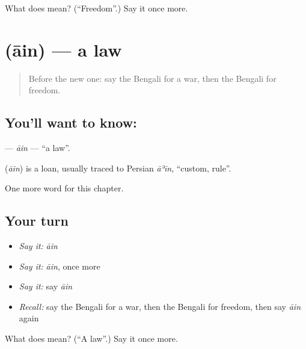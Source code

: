 \begin{tcolorbox}[breakable,colback=teal!4,colframe=teal!35!black,title={Before you move on}]
What does  mean? (\textquotedblleft{}Freedom\textquotedblright{}.) Say it once more.
\end{tcolorbox}
\section[\texorpdfstring{\bn{আইন} (āin)}{আইন (āin)}]{ (āin) — a law}

\label{lesson:BN-C200-ain}



\begin{quote}
Before the new one: say the Bengali for a war, then the Bengali for freedom.
\end{quote}

\subsection*{You'll want to know: }
\textbf{} — \emph{āin} — \textquotedblleft{}a law\textquotedblright{}.

\begin{cousinweb}
\textbf{} (\emph{āin}) is a loan, usually traced to Persian \emph{āʾīn}, \textquotedblleft{}custom, rule\textquotedblright{}.
\end{cousinweb}

\begin{grammarlens}[title={What you've built}]
One more word for this chapter.
\end{grammarlens}

\subsection*{Your turn}
\begin{itemize}
\raggedright
  \item \emph{Say it:} \emph{āin}
  \item \emph{Say it:} \emph{āin}, once more
  \item \emph{Say it:} say \emph{āin}
  \item \emph{Recall:} say the Bengali for a war, then the Bengali for freedom, then say \emph{āin} again
\end{itemize}

\begin{tcolorbox}[breakable,colback=teal!4,colframe=teal!35!black,title={Before you move on}]
What does  mean? (\textquotedblleft{}A law\textquotedblright{}.) Say it once more.
\end{tcolorbox}
